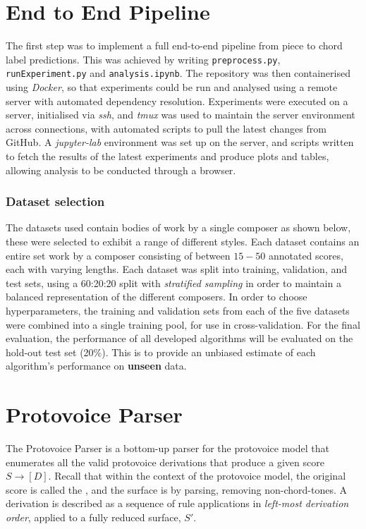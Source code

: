\documentclass[12pt,a4paper,twoside,openright]{report} \usepackage[pdfborder={0 0 0}]{hyperref}    %
\theoremstyle{definition} \newtheorem{definition}{Definition}[section]
\begin{document}
      \section{End to End Pipeline} The first step was to implement a full end-to-end pipeline from piece to chord label
      predictions. This was achieved by writing \texttt{preprocess.py}, \texttt{runExperiment.py} and
      \texttt{analysis.ipynb}. The repository was then containerised using \textit{Docker}, so that experiments could be
      run and analysed using a remote server with automated dependency resolution. Experiments were executed on
      a server, initialised via \textit{ssh}, and \textit{tmux} was used to maintain the server environment across
      connections, with automated scripts to pull the latest changes from GitHub. A \textit{jupyter-lab} environment was
      set up on the server, and scripts written to fetch the results of the latest experiments and produce plots and
      tables, allowing analysis to be conducted through a browser. \subsubsection{Dataset selection}

      The datasets used contain bodies of work by a single composer as shown below, these were selected to exhibit
      a range of different styles. Each dataset contains an entire set work by a composer consisting of between $15-50$
      annotated scores, each with varying lengths. Each dataset was split into training, validation, and test sets,
      using a 60:20:20 split with \textit{stratified sampling} in order to maintain a balanced representation of the
      different composers. In order to choose hyperparameters, the training and validation sets from each of the five
      datasets were combined into a single training pool, for use in cross-validation. For the final evaluation, the
      performance of all developed algorithms will be evaluated on the hold-out test set (20\%). This is to provide an
      unbiased estimate of each algorithm's performance on \textbf{unseen} data.

      \section{Protovoice Parser}

      The Protovoice Parser is a bottom-up parser for the protovoice model that enumerates all the valid protovoice
      derivations that produce a given score $S \to [D]$. Recall that within the context of the protovoice model, the
      original score is called the , and the surface is  by parsing, removing
      non-chord-tones. A derivation is described as a sequence of rule applications in \textit{left-most derivation
      order}, applied to a fully reduced surface, $S'$. 
\end{document}
